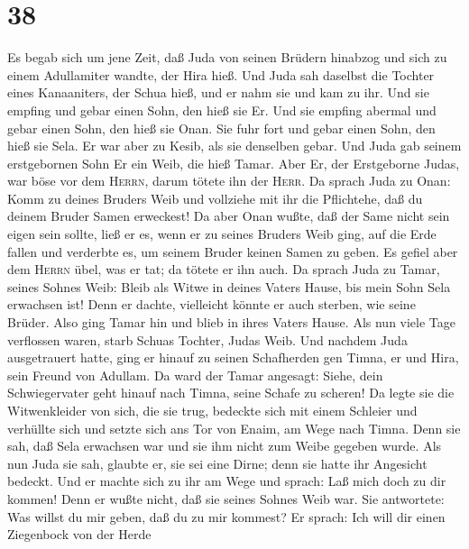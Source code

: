 \hypertarget{section-37}{%
\section{38}\label{section-37}}

 Es begab sich um jene Zeit, daß Juda von seinen Brüdern
hinabzog und sich zu einem Adullamiter wandte, der Hira hieß.
 Und Juda sah daselbst die Tochter eines Kanaaniters, der
Schua hieß, und er nahm sie und kam zu ihr.  Und sie
empfing und gebar einen Sohn, den hieß sie Er.  Und sie
empfing abermal und gebar einen Sohn, den hieß sie Onan. 
Sie fuhr fort und gebar einen Sohn, den hieß sie Sela. Er war aber zu
Kesib, als sie denselben gebar.  Und Juda gab seinem
erstgebornen Sohn Er ein Weib, die hieß Tamar.  Aber Er,
der Erstgeborne Judas, war böse vor dem \textsc{Herrn}, darum tötete ihn
der \textsc{Herr}.  Da sprach Juda zu Onan: Komm zu deines
Bruders Weib und vollziehe mit ihr die Pflichtehe, daß du deinem Bruder
Samen erweckest!  Da aber Onan wußte, daß der Same nicht
sein eigen sein sollte, ließ er es, wenn er zu seines Bruders Weib ging,
auf die Erde fallen und verderbte es, um seinem Bruder keinen Samen zu
geben.  Es gefiel aber dem \textsc{Herrn} übel, was er
tat; da tötete er ihn auch.  Da sprach Juda zu Tamar,
seines Sohnes Weib: Bleib als Witwe in deines Vaters Hause, bis mein
Sohn Sela erwachsen ist! Denn er dachte, vielleicht könnte er auch
sterben, wie seine Brüder. Also ging Tamar hin und blieb in ihres Vaters
Hause.  Als nun viele Tage verflossen waren, starb Schuas
Tochter, Judas Weib. Und nachdem Juda ausgetrauert hatte, ging er hinauf
zu seinen Schafherden gen Timna, er und Hira, sein Freund von Adullam.
 Da ward der Tamar angesagt: Siehe, dein Schwiegervater
geht hinauf nach Timna, seine Schafe zu scheren!  Da
legte sie die Witwenkleider von sich, die sie trug, bedeckte sich mit
einem Schleier und verhüllte sich und setzte sich ans Tor von Enaim, am
Wege nach Timna. Denn sie sah, daß Sela erwachsen war und sie ihm nicht
zum Weibe gegeben wurde.  Als nun Juda sie sah, glaubte
er, sie sei eine Dirne; denn sie hatte ihr Angesicht bedeckt.
 Und er machte sich zu ihr am Wege und sprach: Laß mich
doch zu dir kommen! Denn er wußte nicht, daß sie seines Sohnes Weib war.
Sie antwortete: Was willst du mir geben, daß du zu mir kommest?
 Er sprach: Ich will dir einen Ziegenbock von der Herde
